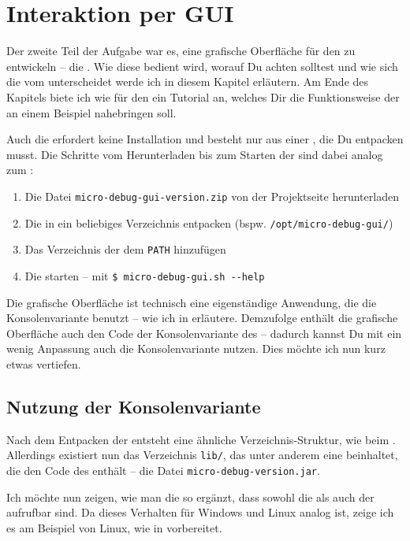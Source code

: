 \chapter{Interaktion per GUI}
Der zweite Teil der Aufgabe war es, eine grafische Oberfläche für den \md zu entwickeln -- die \mdg{}. Wie diese bedient wird, worauf Du achten solltest und wie sich die \mdg{} vom \md unterscheidet werde ich in diesem Kapitel erläutern. Am Ende des Kapitels biete ich wie für den \md ein Tutorial an, welches Dir die Funktionsweise der \mdg{} an einem Beispiel nahebringen soll.

Auch die \mdg{} erfordert keine Installation und besteht nur aus einer , die Du entpacken musst. Die Schritte vom Herunterladen bis zum Starten der \mdg{} sind dabei analog zum \md:

\begin{enumerate}
\item Die Datei \texttt{micro-debug-gui-version.zip} von der Projektseite herunterladen
\item Die  in ein beliebiges Verzeichnis entpacken (bspw. \texttt{/opt/micro-debug-gui/})
\item Das Verzeichnis der \mdg{} dem \texttt{PATH} hinzufügen
\item Die \mdg{} starten -- mit \texttt{\$ micro-debug-gui.sh -{}-help}
\end{enumerate}

Die grafische Oberfläche ist technisch eine eigenständige Anwendung, die die Konsolenvariante benutzt -- wie ich in  erläutere. Demzufolge enthält die grafische Oberfläche auch den Code der Konsolenvariante des \md -- dadurch kannst Du mit ein wenig Anpassung auch die Konsolenvariante nutzen. Dies möchte ich nun kurz etwas vertiefen.

\section{Nutzung der Konsolenvariante}
Nach dem Entpacken der  entsteht eine ähnliche Verzeichnis-Struktur, wie beim \md. Allerdings existiert nun das Verzeichnis \texttt{lib/}, das unter anderem eine  beinhaltet, die den Code des \md enthält -- die Datei \texttt{micro-debug-version.jar}.

Ich möchte nun zeigen, wie man die \mdg{} so ergänzt, dass sowohl die \mdg{} als auch der \md aufrufbar sind. Da dieses Verhalten für Windows und Linux analog ist, zeige ich es am Beispiel von Linux, wie in  vorbereitet.

